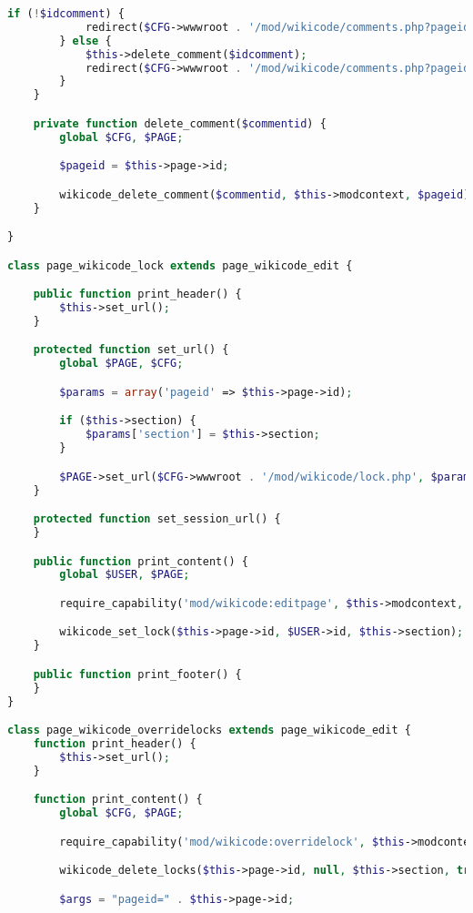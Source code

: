\begin{lstlisting}[language=PHP]
        if (!$idcomment) {
            redirect($CFG->wwwroot . '/mod/wikicode/comments.php?pageid=' . $pageid, get_string('createcomment', 'wikicode'), 2);
        } else {
            $this->delete_comment($idcomment);
            redirect($CFG->wwwroot . '/mod/wikicode/comments.php?pageid=' . $pageid, get_string('editingcomment', 'wikicode'), 2);
        }
    }

    private function delete_comment($commentid) {
        global $CFG, $PAGE;

        $pageid = $this->page->id;

        wikicode_delete_comment($commentid, $this->modcontext, $pageid);
    }

}

class page_wikicode_lock extends page_wikicode_edit {

    public function print_header() {
        $this->set_url();
    }

    protected function set_url() {
        global $PAGE, $CFG;

        $params = array('pageid' => $this->page->id);

        if ($this->section) {
            $params['section'] = $this->section;
        }

        $PAGE->set_url($CFG->wwwroot . '/mod/wikicode/lock.php', $params);
    }

    protected function set_session_url() {
    }

    public function print_content() {
        global $USER, $PAGE;

        require_capability('mod/wikicode:editpage', $this->modcontext, NULL, true, 'noeditpermission', 'wikicode');

        wikicode_set_lock($this->page->id, $USER->id, $this->section);
    }

    public function print_footer() {
    }
}

class page_wikicode_overridelocks extends page_wikicode_edit {
    function print_header() {
        $this->set_url();
    }

    function print_content() {
        global $CFG, $PAGE;

        require_capability('mod/wikicode:overridelock', $this->modcontext, NULL, true, 'nooverridelockpermission', 'wikicode');

        wikicode_delete_locks($this->page->id, null, $this->section, true, true);

        $args = "pageid=" . $this->page->id;


\end{lstlisting}
